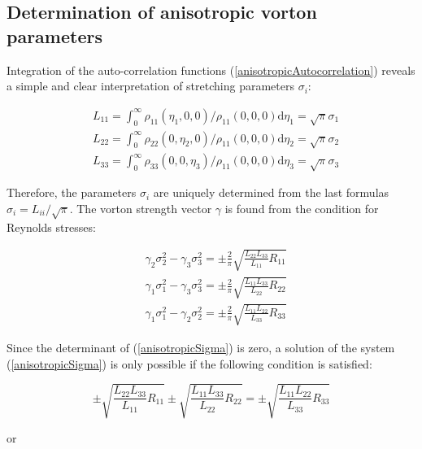 \subsection{Determination of anisotropic vorton parameters}

Integration of the auto-correlation functions (\ref{anisotropicAutocorrelation}) reveals a simple and clear interpretation of stretching parameters $\sigma_i$:

\begin{equation} \label{anisotropicScale}
\begin{split}
&L_{11} = \int_0^{\infty}\rho_{11}(\eta_1,0,0)/\rho_{11}(0,0,0)\mathrm{d}\eta_1 = \sqrt{\pi}\sigma_1 \\
&L_{22} = \int_0^{\infty}\rho_{22}(0,\eta_2,0)/\rho_{11}(0,0,0)\mathrm{d}\eta_2 = \sqrt{\pi}\sigma_2 \\
&L_{33} = \int_0^{\infty}\rho_{33}(0,0,\eta_3)/\rho_{11}(0,0,0)\mathrm{d}\eta_3 = \sqrt{\pi}\sigma_3
\end{split}
\end{equation}

\noindent Therefore, the parameters $\sigma_i$ are uniquely determined from the last formulas $\sigma_i =L_{ii}/\sqrt{\pi}$. The vorton strength vector $\gamma$ is found from the condition for Reynolds stresses:

\begin{equation} \label{anisotropicSigma}
\begin{split}
&\gamma_2\sigma_2^2-\gamma_3\sigma_3^2 = \pm\frac{2}{\pi}\sqrt{\frac{L_{22}L_{33}}{L_{11}}R_{11}} \\
&\gamma_1\sigma_1^2-\gamma_3\sigma_3^2 = \pm\frac{2}{\pi}\sqrt{\frac{L_{11}L_{33}}{L_{22}}R_{22}} \\
&\gamma_1\sigma_1^2-\gamma_2\sigma_2^2 = \pm\frac{2}{\pi}\sqrt{\frac{L_{11}L_{22}}{L_{33}}R_{33}}
\end{split}
\end{equation}

\noindent Since the determinant of (\ref{anisotropicSigma}) is zero, a solution of the system (\ref{anisotropicSigma}) is only possible if the following condition is satisfied:

\begin{equation} \label{anisotropicCondition}
	\pm\sqrt{\frac{L_{22}L_{33}}{L_{11}}R_{11}}\pm\sqrt{\frac{L_{11}L_{33}}{L_{22}}R_{22}}=\pm\sqrt{\frac{L_{11}L_{22}}{L_{33}}R_{33}}
\end{equation}

\noindent or

